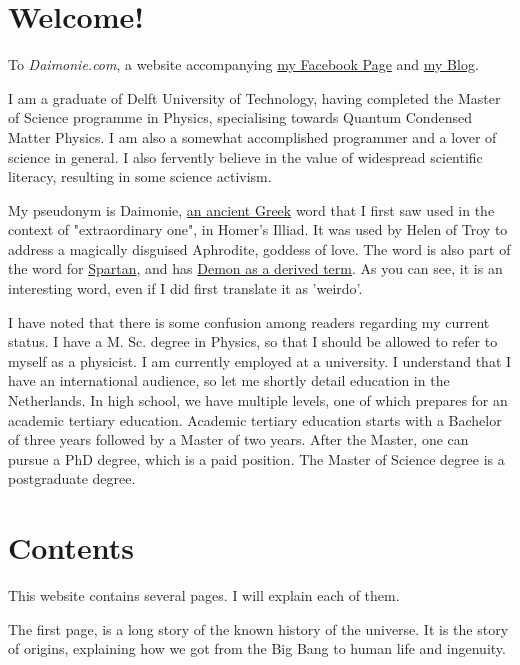 

\begin{multicols}{2}

\section{Welcome!} 


To \emph{Daimonie.com}, a website accompanying \href{https://www.facebook.com/daimonie}{my Facebook Page} and \href{./blog"}{my Blog}.

I am a graduate of Delft University of Technology, having completed the Master of Science programme in Physics, specialising towards Quantum Condensed Matter Physics. I am also a somewhat accomplished programmer and a lover of science in general. I also fervently believe in the value of widespread scientific literacy, resulting in some science activism. 

My pseudonym is Daimonie, \href{https://goo.gl/xwLXc1}{an ancient Greek} word that I first saw used in  the context of "extraordinary one", in Homer's Illiad.  It was used by Helen of Troy to address a magically disguised Aphrodite, goddess of love. The word is also part of the word for \href{https://goo.gl/kktWCr}{Spartan}, and has \href{https://goo.gl/sKxvMo}{Demon as a derived term}. As you can see, it is an interesting word, even if I did first translate it as 'weirdo'.

I have noted that there is some confusion among readers regarding my current status. I have a M. Sc. degree in Physics, so that I should be allowed to refer to myself as a physicist. I am currently employed at a university. I understand that I have an international audience, so let me shortly detail education in the Netherlands. In high school, we have multiple levels, one of which prepares for an academic tertiary education. Academic tertiary education starts with a Bachelor of three years followed by a Master of two years. After the Master, one can pursue a PhD degree, which is a paid position. The Master of Science degree is a postgraduate degree.


\section{Contents}  
This website contains several pages. I will explain each of them.

The first page,  is a long story of the known history of the universe. It is the story of origins, explaining how we got from the Big Bang to human life and ingenuity.


\end{multicols}
